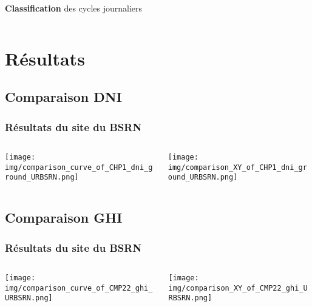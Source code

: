 \documentclass[8pt]{beamer}
\begin{document}
\begin{frame}
\begin{columns}[b]
\begin{column}{0.33\linewidth}
\begin{table}[!h]
\begin{tabular}{>{\footnotesize\bfseries}l | >{\footnotesize}c >{\footnotesize}c}
					\bottomrule
				\end{tabular}
			\end{table}
			\textbf{Classification} des cycles journaliers
			
		\end{column}
	\end{columns}
\end{frame}




\section{Résultats}
\subsection{Comparaison DNI}
\begin{frame}
	\frametitle{Résultats du site du BSRN}
	\begin{columns}[T] %
		\begin{column}{0.49\linewidth} %
			\centering
			\texttt{[image: img/comparison\_curve\_of\_CHP1\_dni\_ground\_URBSRN.png]}
		\end{column}
		\begin{column}{0.49\linewidth} %
			\centering
			\texttt{[image: img/comparison\_XY\_of\_CHP1\_dni\_ground\_URBSRN.png]}
		\end{column}
	\end{columns}
\end{frame}


\subsection{Comparaison GHI}
\begin{frame}
	\frametitle{Résultats du site du BSRN}
	\begin{columns}[T] %
		\begin{column}{0.49\linewidth} %
			\centering
			\texttt{[image: img/comparison\_curve\_of\_CMP22\_ghi\_URBSRN.png]}
		\end{column}
		\begin{column}{0.49\linewidth} %
			\centering
			\texttt{[image: img/comparison\_XY\_of\_CMP22\_ghi\_URBSRN.png]}
		\end{column}
	\end{columns}
\end{frame}
\end{document}
